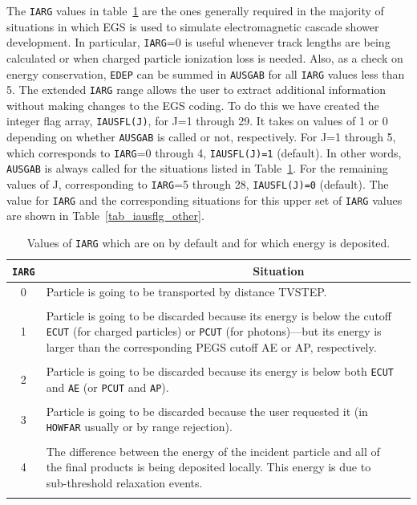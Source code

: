 The {\tt IARG} values in table~\ref{tab_iausfl_low} are the ones
generally required in the majority of situations in which EGS is used
to simulate electromagnetic cascade shower development.  In particular,
{\tt IARG}=0 is useful whenever track lengths are being calculated or when
charged particle ionization loss is needed.  Also, as a check on energy
conservation, {\tt EDEP} can be summed in {\tt AUSGAB} for all {\tt IARG}
values less than 5.  The extended {\tt IARG} range allows the user to
extract additional information without making changes to the EGS coding.
To do this we have created the integer flag array, {\tt IAUSFL(J)},
for J=1 through 29.  It takes on values of 1 or 0 depending on whether
{\tt AUSGAB} is called or not, respectively.  For J=1 through 5, which
corresponds to {\tt IARG}=0 through 4, {\tt IAUSFL(J)=1} (default).
In other words, {\tt AUSGAB} is always called for the situations
listed in Table~\ref{tab_iausfl_low}.  For the remaining values of J,
corresponding to {\tt IARG}=5 through 28, {\tt IAUSFL(J)=0} (default).
The value for {\tt IARG} and the corresponding situations for this upper
set of {\tt IARG} values are shown in Table~\ref{tab_iausflg_other}.
    \begin{table}[hbt]
    \begin{center}
\caption{Values of {\tt IARG} which are on by default and for which energy is
deposited.}
    \label{tab_iausfl_low}
\vspace*{4mm}
    \begin{tabular}{ c   p{135mm}l  |}
    \hline
    {\tt IARG} & ~~~~~~~~~~~~~~~~~~~~~~~~~~~~~~~~Situation \\
    \hline
0	& Particle is going to be transported by distance TVSTEP.\\
    &\\
1	&Particle is going to be discarded because its energy is below the
cutoff {\tt ECUT} (for charged particles) or {\tt PCUT} (for photons)---but its energy
is larger than the corresponding PEGS cutoff AE or AP, respectively.\\
    &\\
2	& Particle is going to be discarded because its energy is below
both {\tt ECUT} and {\tt AE} (or {\tt PCUT} and {\tt AP}).\\
	&\\
3	& Particle is going to be discarded because the user requested it
(in {\tt HOWFAR} usually or by range rejection).  \\
	&\\
4	&The difference between the energy of the incident particle and
         all of the final products is being deposited locally. This
         energy is  due to sub-threshold relaxation events.\\
	&\\
\hline
\end{tabular}
\end{center}
\end{table}
